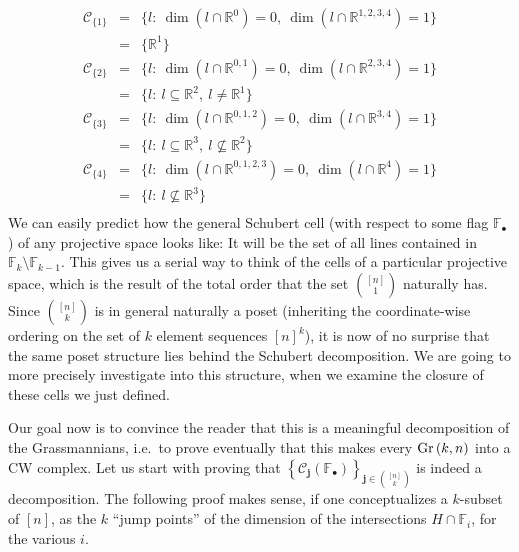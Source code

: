 \[\begin{array}{rcl}
\mathcal{C}_{\{1\}}&=&\big\{l:\ \dim(l\cap\mathbb{R}^{0})=0,\ \dim(l\cap\mathbb{R}^{1,2,3,4})=1\big\}\\
&=&\big\{\mathbb{R}^1\big\}\\[.6em]
\mathcal{C}_{\{2\}}&=&\big\{l:\ \dim(l\cap\mathbb{R}^{0,1})=0,\ \dim(l\cap\mathbb{R}^{2,3,4})=1\big\}\\
&=&\big\{l:\ l\subseteq\mathbb{R}^2,\ l\neq\mathbb{R}^1\big\}\\[.6em]
\mathcal{C}_{\{3\}}&=&\big\{l:\ \dim(l\cap\mathbb{R}^{0,1,2})=0,\ \dim(l\cap\mathbb{R}^{3,4})=1\big\}\\
&=&\big\{l:\ l\subseteq\mathbb{R}^3,\ l\not\subseteq\mathbb{R}^2\big\}\\[.6em]
\mathcal{C}_{\{4\}}&=&\big\{l:\ \dim(l\cap\mathbb{R}^{0,1,2,3})=0,\ \dim(l\cap\mathbb{R}^{4})=1\big\}\\
&=&\big\{l:\ l\not\subseteq\mathbb{R}^3\big\}\\[.6em]
\end{array}\]
We can easily predict how the general Schubert cell (with respect to some flag $\mathbb{F}_{\bullet}$) of any projective space looks like: It will be the set of all lines contained in $\mathbb{F}_k\setminus\mathbb{F}_{k-1}$. This gives us a serial way to think of the cells of a particular projective space, which is the result of the total order that the set $\binom{[n]}{1}$ naturally has. Since $\binom{[n]}{k}$ is in general naturally a poset (inheriting the coordinate-wise ordering on the set of $k$ element sequences ${[n]}^k$), it is now of no surprise that the same poset structure lies behind the Schubert decomposition. We are going to more precisely investigate into this structure, when we examine the closure of these cells we just defined.

Our goal now is to convince the reader that this is a meaningful decomposition of the Grassmannians, i.e.\ to prove eventually that this makes every $\Gr{k}{n}$ into a CW complex. Let us start with proving that ${\left\{\mathcal{C}_{\mathbf{j}}(\mathbb{F}_{\bullet})\right\}}_{\mathbf{j}\in\binom{[n]}{k}}$ is indeed a decomposition. The following proof makes sense, if one conceptualizes a $k$-subset of $[n]$, as the $k$ ``jump points'' of the dimension of the intersections $H\cap\mathbb{F}_i$, for the various $i$.

